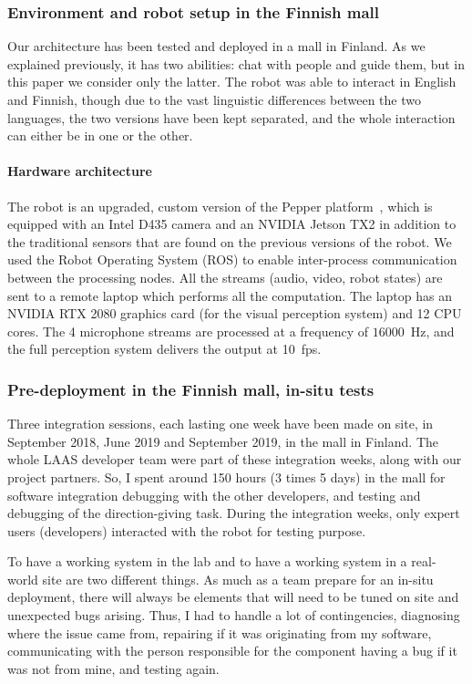 \documentclass[a4paper,11pt,twoside]{StyleThese}
\begin{document}
\subsubsection{Environment and robot setup in the Finnish mall}\label{subsec:setup_mall}
Our architecture has been tested and deployed in a mall in Finland. As we explained previously, it has two abilities: chat with people and guide them, but in this paper we consider only the latter. The robot was able to interact in English and Finnish, though due to the vast linguistic differences between the two languages, the two versions have been kept separated, and the whole interaction can either be in one or the other. 


\paragraph{Hardware architecture}\label{subsec:hw}
The robot is an upgraded, custom version of the Pepper platform~\cite{caniot_adapted_2020}, which is equipped with an Intel D435 camera and an NVIDIA Jetson TX2 in addition to the traditional sensors that are found on the previous versions of the robot. We used the Robot Operating System (ROS) to enable inter-process communication between the processing nodes. All the streams (audio, video, robot states) are sent to a remote laptop which performs all the computation. The laptop has an NVIDIA RTX 2080 graphics card (for the visual perception system) and 12 CPU cores. The 4 microphone streams are processed at a frequency of $16000$~Hz, and the full perception system delivers the output at 10~fps.

\subsubsection{Pre-deployment in the Finnish mall, in-situ tests}\label{subsec:tests_mall}

Three integration sessions, each lasting one week have been made on site, in September 2018, June 2019 and September 2019, in the mall in Finland. The whole LAAS developer team were part of these integration weeks, along with our project partners. So, I spent around 150 hours (3 times 5 days) in the mall for software integration debugging with the other developers, and testing and debugging of the direction-giving task. 
During the integration weeks, only expert users (developers) interacted with the robot for testing purpose. 

To have a working system in the lab and to have a working system in a real-world site are two different things. As much as a team prepare for an in-situ deployment, there will always be elements that will need to be tuned on site and unexpected bugs arising. Thus, I had to handle a lot of contingencies, diagnosing where the issue came from, repairing if it was originating from my software, communicating with the person responsible for the component having a bug if it was not from mine, and testing again.
\end{document}

